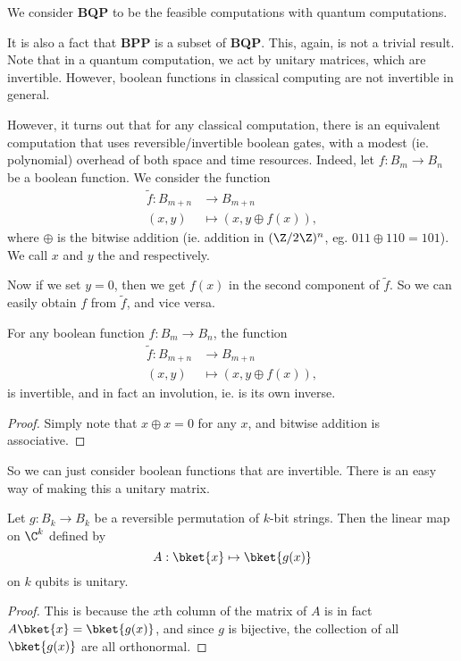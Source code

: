 \documentclass[a4paper]{article}
\begin{document}
We consider \textbf{BQP} to be the feasible computations with quantum computations.

It is also a fact that \textbf{BPP} is a subset of \textbf{BQP}. This, again, is not a trivial result. Note that in a quantum computation, we act by unitary matrices, which are invertible. However, boolean functions in classical computing are not invertible in general.

However, it turns out that for any classical computation, there is an equivalent computation that uses reversible/invertible boolean gates, with a modest (ie. polynomial) overhead of both space and time resources. Indeed, let $f: B_m \to B_n$ be a boolean function. We consider the function
\begin{align*}
  \tilde{f}: B_{m + n} &\to B_{m + n}\\
  (x, y) &\mapsto (x, y \oplus f(x)),
\end{align*}
where $\oplus$ is the bitwise addition (ie. addition in $(\Z/2\Z)^n$, eg. $011 \oplus 110 = 101$). We call $x$ and $y$ the  and  respectively.

Now if we set $y = 0$, then we get $f(x)$ in the second component of $\tilde{f}$. So we can easily obtain $f$ from $\tilde{f}$, and vice versa.

\begin{lemma}
  For any boolean function $f: B_m \to B_n$, the function
  \begin{align*}
    \tilde{f}: B_{m + n} &\to B_{m + n}\\
    (x, y) &\mapsto (x, y \oplus f(x)),
  \end{align*}
  is invertible, and in fact an involution, ie. is its own inverse.
\end{lemma}

\begin{proof}
  Simply note that $x \oplus x = 0$ for any $x$, and bitwise addition is associative.
\end{proof}

So we can just consider boolean functions that are invertible. There is an easy way of making this a unitary matrix.
\begin{lemma}
  Let $g: B_k \to B_k$ be a reversible permutation of $k$-bit strings. Then the linear map on $\C^k$ defined by
  \[
    A:\bket{x} \mapsto \bket{g(x)}
  \]
  on $k$ qubits is unitary.
\end{lemma}

\begin{proof}
  This is because the $x$th column of the matrix of $A$ is in fact $A\bket{x} = \bket{g(x)}$, and since $g$ is bijective, the collection of all $\bket{g(x)}$ are all orthonormal.
\end{proof}
\end{document}
